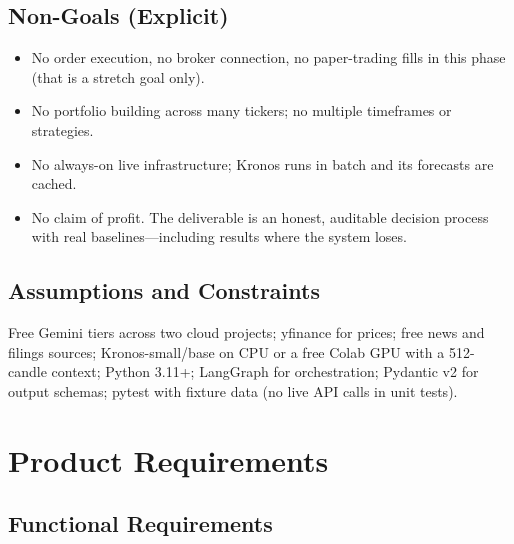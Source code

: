 \documentclass[conference]{IEEEtran}
\begin{document}
\subsection{Non-Goals (Explicit)}

\begin{itemize}[leftmargin=*,itemsep=1pt,topsep=2pt]
  \item No order execution, no broker connection, no paper-trading fills in this phase (that is a stretch goal only).
  \item No portfolio building across many tickers; no multiple timeframes or strategies.
  \item No always-on live infrastructure; Kronos runs in batch and its forecasts are cached.
  \item No claim of profit. The deliverable is an honest, auditable decision process with real baselines---including results where the system loses.
\end{itemize}

\subsection{Assumptions and Constraints}

Free Gemini tiers across two cloud projects; yfinance for prices; free news and filings sources; Kronos-small/base on CPU or a free Colab GPU with a 512-candle context; Python 3.11+; LangGraph for orchestration; Pydantic v2 for output schemas; pytest with fixture data (no live API calls in unit tests).

\section{Product Requirements}
\label{sec:product}

\subsection{Functional Requirements}
\end{document}
